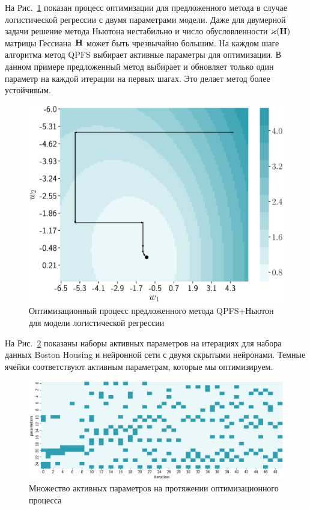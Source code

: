 На Рис.~\ref{ch4:fig:irls_qpfs_2d} показан процесс оптимизации для предложенного метода в случае логистической регрессии с двумя параметрами модели. 
Даже для двумерной задачи решение метода Ньютона нестабильно и число обусловленности $\varkappa(\mathbf{H})$ матрицы Гессиана~$\mathbf{H}$ может быть чрезвычайно большим. 
На каждом шаге алгоритма метод QPFS выбирает активные параметры для оптимизации. 
В данном примере предложенный метод выбирает и обновляет только один параметр на каждой итерации на первых шагах. 
Это делает метод более устойчивым.

\begin{figure}
	\centering
	\includegraphics[width=0.6\linewidth]{figs/ch4/irls_qpfs_2d}	 
	\caption{Оптимизационный процесс предложенного метода QPFS+Ньютон для модели логистической регрессии}
	\label{ch4:fig:irls_qpfs_2d}
\end{figure}

На Рис.~\ref{ch4:fig:active_params_wrt_iters} показаны наборы активных параметров на итерациях для набора данных Boston Housing и нейронной сети с двумя скрытыми нейронами. 
Темные ячейки соответствуют активным параметрам, которые мы оптимизируем.
 
\begin{figure}
	\centering
	\includegraphics[width=\linewidth]{figs/ch4/active_params_wrt_iters}	
	\caption{Множество активных параметров на протяжении оптимизационного процесса}
	\label{ch4:fig:active_params_wrt_iters}
\end{figure}

